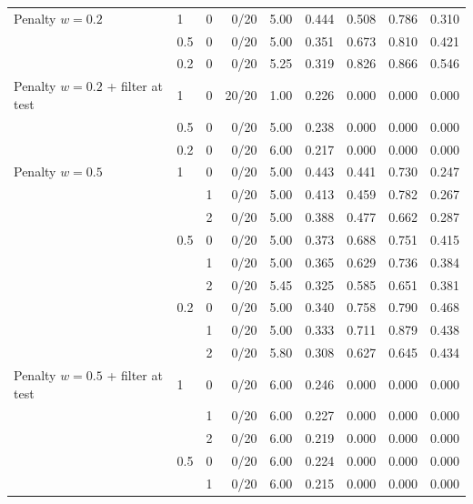{\begin{tabular}{llrrrrrrr}
\addlinespace
Penalty $w{=}0.2$ & 1 & 0 & 0/20 & 5.00 & 0.444 & 0.508 & 0.786 & 0.310 \\
 & 0.5 & 0 & 0/20 & 5.00 & 0.351 & 0.673 & 0.810 & 0.421 \\
 & 0.2 & 0 & 0/20 & 5.25 & 0.319 & 0.826 & 0.866 & 0.546 \\
\addlinespace
Penalty $w{=}0.2$ + filter at test & 1 & 0 & 20/20 & 1.00 & 0.226 & 0.000 & 0.000 & 0.000 \\
 & 0.5 & 0 & 0/20 & 5.00 & 0.238 & 0.000 & 0.000 & 0.000 \\
 & 0.2 & 0 & 0/20 & 6.00 & 0.217 & 0.000 & 0.000 & 0.000 \\
\addlinespace
Penalty $w{=}0.5$ & 1 & 0 & 0/20 & 5.00 & 0.443 & 0.441 & 0.730 & 0.247 \\
 &  & 1 & 0/20 & 5.00 & 0.413 & 0.459 & 0.782 & 0.267 \\
 &  & 2 & 0/20 & 5.00 & 0.388 & 0.477 & 0.662 & 0.287 \\
 & 0.5 & 0 & 0/20 & 5.00 & 0.373 & 0.688 & 0.751 & 0.415 \\
 &  & 1 & 0/20 & 5.00 & 0.365 & 0.629 & 0.736 & 0.384 \\
 &  & 2 & 0/20 & 5.45 & 0.325 & 0.585 & 0.651 & 0.381 \\
 & 0.2 & 0 & 0/20 & 5.00 & 0.340 & 0.758 & 0.790 & 0.468 \\
 &  & 1 & 0/20 & 5.00 & 0.333 & 0.711 & 0.879 & 0.438 \\
 &  & 2 & 0/20 & 5.80 & 0.308 & 0.627 & 0.645 & 0.434 \\
\addlinespace
Penalty $w{=}0.5$ + filter at test & 1 & 0 & 0/20 & 6.00 & 0.246 & 0.000 & 0.000 & 0.000 \\
 &  & 1 & 0/20 & 6.00 & 0.227 & 0.000 & 0.000 & 0.000 \\
 &  & 2 & 0/20 & 6.00 & 0.219 & 0.000 & 0.000 & 0.000 \\
 & 0.5 & 0 & 0/20 & 6.00 & 0.224 & 0.000 & 0.000 & 0.000 \\
 &  & 1 & 0/20 & 6.00 & 0.215 & 0.000 & 0.000 & 0.000 \\
\bottomrule\end{tabular}}
